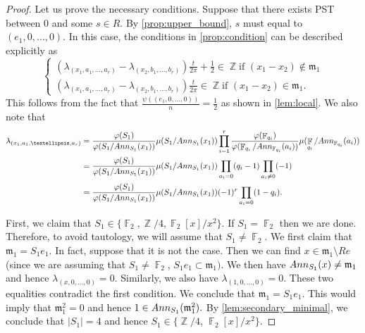 \documentclass[10pt,a4paper]{amsart}
\newcommand{\Ann}{{\rm Ann}}
\DeclareMathOperator{\F}{\mathbb{F}}
\DeclareMathOperator{\Z}{\mathbb{Z}}
\begin{document}
\begin{proof}
    Let us prove the necessary conditions. Suppose that there exists PST between $0$ and some $s \in R.$ By \cref{prop:upper_bound}, $s$ must equal to $(e_1, 0, \ldots, 0).$ In this case, the conditions in \cref{prop:condition} can be described explicitly as 
\begin{equation} \label{eq:conditions}
    \begin{cases}
    (\lambda_{(x_1, a_1, \ldots, a_r)} - \lambda_{(x_2, b_1, \ldots, b_r)}) \frac{t}{2 \pi} + \frac{1}{2} \in \Z  \text{if } (x_1-x_2) \not \in \mathfrak{m}_1 \\ 
    (\lambda_{(x_1, a_1, \ldots, a_r)} - \lambda_{(x_2, b_1, \ldots, b_r)}) \frac{t}{2 \pi}  \in \Z  \text{if  } (x_1-x_2)  \in \mathfrak{m}_1.
\end{cases} 
\end{equation}
This follows from the fact that $\frac{\psi((e_1,0, \ldots, 0))}{n}= \frac{1}{2}$ as shown in \cref{lem:local}. We also note that 
\begin{align*} 
\lambda_{(x_1, a_1, \ldots, a_r)} &= \frac{\varphi(S_1)}{\varphi(S_1/\Ann_{S_1}(x_1))} \mu(S_1/\Ann_{S_1}(x_1)) \prod_{i=1}^r \frac{\varphi(\F_{q_i})}{\varphi(\F_{q_i}/\Ann_{\F_{q_i}}(a_i))} \mu(\F_{q_i}/\Ann_{\F_{q_i}}(a_i)) \\ 
&= \frac{\varphi(S_1)}{\varphi(S_1/\Ann_{S_1}(x_1))} \mu(S_1/\Ann_{S_1}(x_1)) \prod_{a_i =0} (q_i-1) \prod_{a_i \neq 0 }(-1) \\
&= \frac{\varphi(S_1)}{\varphi(S_1/\Ann_{S_1}(x_1))} \mu(S_1/\Ann_{S_1}(x_1)) (-1)^r \prod_{a_i =0} (1-q_i).
\end{align*}



First, we claim that $S_1 \in \{\F_2, \Z/4, \F_2[x]/x^2 \}.$ If $S_1=\F_2$ then we are done. Therefore, to avoid tautology, we will assume that $S_1 \neq \F_2.$ We first claim that $\mathfrak{m}_1=S_1e_1$. In fact, suppose that it is not the case. Then we can find $x \in \mathfrak{m}_1 \setminus Re$ (since we are assuming that $S_1 \neq \F_2$, $S_1e_1 \subset \mathfrak{m}_1).$ We then have $\Ann_{S_1}(x) \neq \mathfrak{m}_1$ and hence $\lambda_{(x,0,\ldots,0)}=0.$ Similarly, we also have $\lambda_{(1,0,\ldots, 0)}=0$. These two equalities contradict the first condition. We conclude that $\mathfrak{m}_1 = S_1 e_1.$ This would imply that $\mathfrak{m}_1^2=0$ and hence $1 \in \Ann_{S_1}(\mathfrak{m}_1^2).$ By \cref{lem:secondary_minimal}, we conclude that $|S_1|=4$ and hence $S_1 \in \{ \Z/4$, $\F_2[x]/x^2 \}.$ 


\end{proof}
\end{document}
